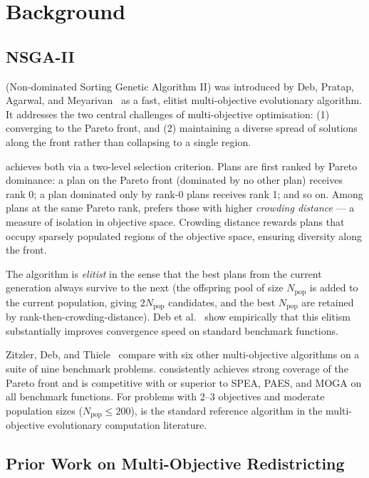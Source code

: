 \section{Background}
\label{sec:background}

\subsection{NSGA-II}

\nsga{} (Non-dominated Sorting Genetic Algorithm II) was introduced by
Deb, Pratap, Agarwal, and Meyarivan~\citeyear{deb2002} as a fast, elitist
multi-objective evolutionary algorithm.
It addresses the two central challenges of multi-objective optimisation:
(1) converging to the Pareto front, and (2) maintaining a diverse spread of
solutions along the front rather than collapsing to a single region.

\nsga{} achieves both via a two-level selection criterion.
Plans are first ranked by Pareto dominance: a plan on the Pareto front
(dominated by no other plan) receives rank 0; a plan dominated only by
rank-0 plans receives rank 1; and so on.
Among plans at the same Pareto rank, \nsga{} prefers those with higher
\emph{crowding distance} --- a measure of isolation in objective space.
Crowding distance rewards plans that occupy sparsely populated regions of the
objective space, ensuring diversity along the front.

The algorithm is \emph{elitist} in the sense that the best plans from the
current generation always survive to the next (the offspring pool of size
$N_{\mathrm{pop}}$ is added to the current population, giving $2N_{\mathrm{pop}}$
candidates, and the best $N_{\mathrm{pop}}$ are retained by
rank-then-crowding-distance).
Deb et al.~\citeyear{deb2002} show empirically that this elitism substantially
improves convergence speed on standard benchmark functions.

Zitzler, Deb, and Thiele~\citeyear{zitzler2000} compare \nsga{} with six
other multi-objective algorithms on a suite of nine benchmark problems.
\nsga{} consistently achieves strong coverage of the Pareto front and is
competitive with or superior to SPEA, PAES, and MOGA on all benchmark
functions.
For problems with 2--3 objectives and moderate population sizes
($N_{\mathrm{pop}} \leq 200$), \nsga{} is the standard reference algorithm
in the multi-objective evolutionary computation literature.

\subsection{Prior Work on Multi-Objective Redistricting}

